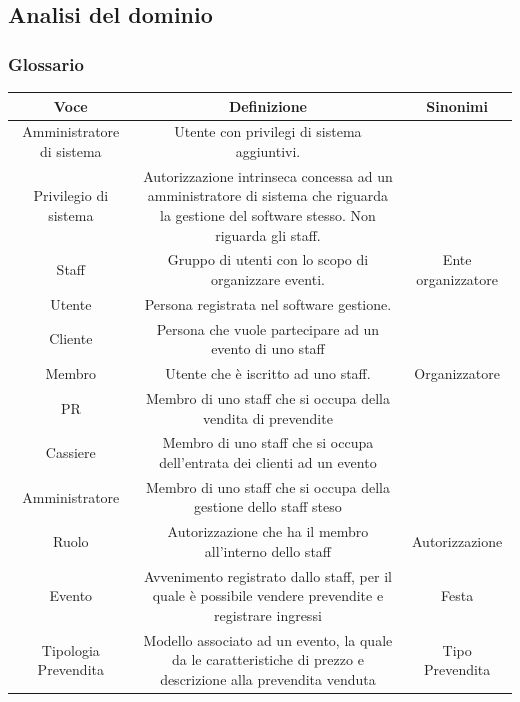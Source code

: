 \documentclass[a4paper]{article}
\begin{document}
\newpage

\subsection{Analisi del dominio}

\subsubsection{Glossario}

\begin{table}[ht!]
  \begin{center}
    \begin{tabulary}{1\textwidth}{c|C|C}
        \textbf{Voce} & \textbf{Definizione} & \textbf{Sinonimi}\\
        \hline
        \hline
		Amministratore di sistema & Utente con privilegi di sistema aggiuntivi. & \\
		\hline
		Privilegio di sistema & Autorizzazione intrinseca concessa ad un amministratore di sistema che riguarda la gestione del software stesso. Non riguarda gli staff. & \\
		\hline
        Staff & Gruppo di utenti con lo scopo di organizzare eventi. & Ente organizzatore \\
        \hline
        Utente & Persona registrata nel software gestione. & \\
        \hline
		Cliente & Persona che vuole partecipare ad un evento di uno staff & \\
		\hline
        Membro & Utente che è iscritto ad uno staff. & Organizzatore \\
        \hline
		PR & Membro di uno staff che si occupa della vendita di prevendite & \\
		\hline
		Cassiere & Membro di uno staff che si occupa dell'entrata dei clienti ad un evento & \\
		\hline
		Amministratore & Membro di uno staff che si occupa della gestione dello staff steso & \\
		\hline
        Ruolo & Autorizzazione che ha il membro all'interno dello staff & Autorizzazione \\
        \hline
        Evento & Avvenimento registrato dallo staff, per il quale è possibile vendere prevendite e registrare ingressi & Festa \\
        \hline
        Tipologia Prevendita & Modello associato ad un evento, la quale da le caratteristiche di prezzo e descrizione alla prevendita venduta & Tipo Prevendita \\

\end{tabulary}
\end{center}
\end{table}
\end{document}
